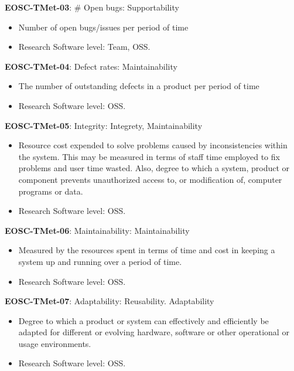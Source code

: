 \textbf{EOSC-TMet-03}: \# Open bugs: Supportability

\begin{itemize}
    \item Number of open bugs/issues per period of time \cite{montagud_systematic_2012}
    \item Research Software level: Team, OSS.
\end{itemize}

\textbf{EOSC-TMet-04}: Defect rates: Maintainability

\begin{itemize}
    \item The number of outstanding defects in a product per period of time \cite{crispin_driving_2006}
    \item Research Software level: OSS.
\end{itemize}

\textbf{EOSC-TMet-05}: Integrity: Integrety, Maintainability

\begin{itemize}
    \item Resource cost expended to solve problems caused by inconsistencies within the system. This may be measured in terms of staff time employed to fix problems and user time wasted. Also, degree to which a system, product or component prevents unauthorized access to, or modification of,
computer programs or data. \cite{iso_25010_2011_2017,gillies_modelling_1992}
    \item Research Software level: OSS.
\end{itemize}

\textbf{EOSC-TMet-06}: Maintainability: Maintainability

\begin{itemize}
    \item Measured by the resources spent in terms of time and cost in keeping a system up and running over a period of time. \cite{gillies_modelling_1992,boehm_quantitative_1976}
    \item Research Software level: OSS.
\end{itemize}

\textbf{EOSC-TMet-07}: Adaptability: Reusability. Adaptability

\begin{itemize}
    \item Degree to which a product or system can effectively and efficiently be adapted for different or evolving hardware, software or other operational or usage environments. \cite{iso_25010_2011_2017,gillies_modelling_1992,boehm_quantitative_1976}
    \item Research Software level: OSS.
\end{itemize}

